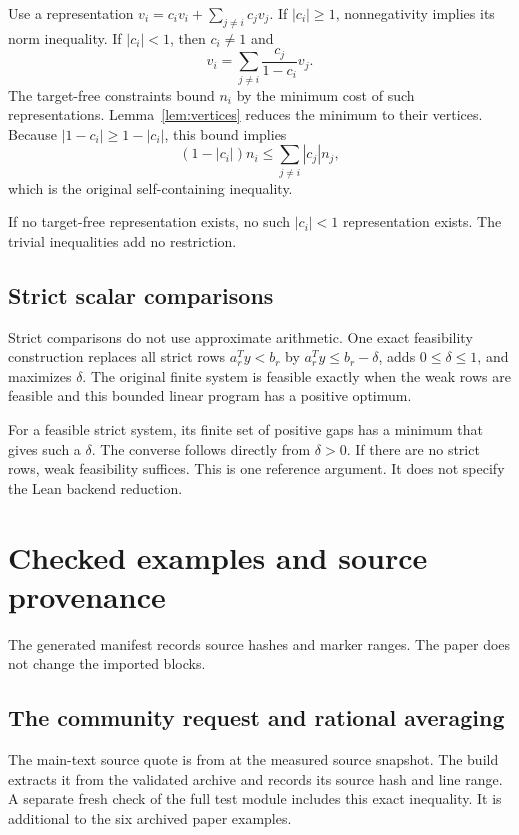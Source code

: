 Use a representation $v_i=c_iv_i+\sum_{j\ne i}c_jv_j$.
If $|c_i|\ge1$, nonnegativity implies its norm inequality.
If $|c_i|<1$, then $c_i\ne1$ and
\[
 v_i=\sum_{j\ne i}\frac{c_j}{1-c_i}v_j.
\]
The target-free constraints bound $n_i$ by the minimum cost of such representations.
Lemma~\ref{lem:vertices} reduces the minimum to their vertices.
Because $|1-c_i|\ge1-|c_i|$, this bound implies
\[
 (1-|c_i|)n_i\le\sum_{j\ne i}|c_j|n_j,
\]
which is the original self-containing inequality.

If no target-free representation exists, no such $|c_i|<1$ representation exists.
The trivial inequalities add no restriction.

\subsection{Strict scalar comparisons}
Strict comparisons do not use approximate arithmetic.
One exact feasibility construction replaces all strict rows $a_r^Ty<b_r$ by
$a_r^Ty\le b_r-\delta$, adds $0\le\delta\le1$, and maximizes $\delta$.
The original finite system is feasible exactly when the weak rows are feasible and this bounded linear program has a positive optimum.

For a feasible strict system, its finite set of positive gaps has a minimum that gives such a $\delta$.
The converse follows directly from $\delta>0$.
If there are no strict rows, weak feasibility suffices.
This is one reference argument.
It does not specify the Lean backend reduction.

\section{Checked examples and source provenance}\label{app:examples}

The generated manifest records source hashes and marker ranges.
The paper does not change the imported blocks.

\subsection{The community request and rational averaging}
The main-text source quote is from  at the measured source snapshot.
The build extracts it from the validated archive and records its source hash and line range.
A separate fresh check of the full test module includes this exact inequality.
It is additional to the six archived paper examples.

